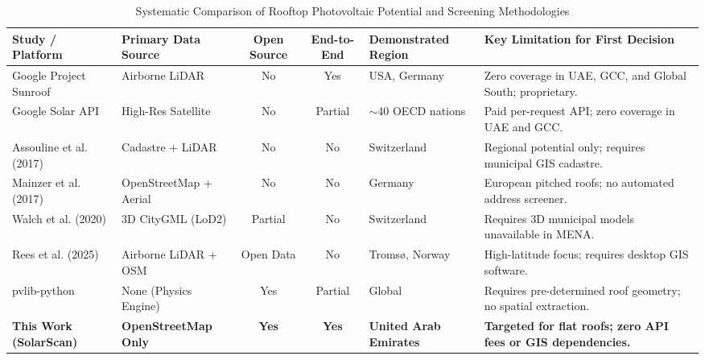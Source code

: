 \begin{table}[t]
\centering
\caption{Systematic Comparison of Rooftop Photovoltaic Potential and Screening Methodologies}
\label{tab:prior_art}
\footnotesize
\setlength{\tabcolsep}{3.5pt}
\begin{tabular}{p{2.9cm}p{2.6cm}ccp{2.5cm}p{5.6cm}}
\toprule
\textbf{Study / Platform} & \textbf{Primary Data Source} & \textbf{Open Source} & \textbf{End-to-End} & \textbf{Demonstrated Region} & \textbf{Key Limitation for First Decision} \\
\midrule
Google Project Sunroof & Airborne LiDAR & No & Yes & USA, Germany & Zero coverage in UAE, GCC, and Global South; proprietary. \\
Google Solar API & High-Res Satellite & No & Partial & $\sim$40 OECD nations & Paid per-request API; zero coverage in UAE and GCC. \\
Assouline et al. (2017) \cite{assouline2017} & Cadastre + LiDAR & No & No & Switzerland & Regional potential only; requires municipal GIS cadastre. \\
Mainzer et al. (2017) \cite{mainzer2017} & OpenStreetMap + Aerial & No & No & Germany & European pitched roofs; no automated address screener. \\
Walch et al. (2020) \cite{walch2020} & 3D CityGML (LoD2) & Partial & No & Switzerland & Requires 3D municipal models unavailable in MENA. \\
Rees et al. (2025) \cite{rees2025} & Airborne LiDAR + OSM & Open Data & No & Troms\o, Norway & High-latitude focus; requires desktop GIS software. \\
pvlib-python \cite{holmgren2018} & None (Physics Engine) & Yes & Partial & Global & Requires pre-determined roof geometry; no spatial extraction. \\
\textbf{This Work (SolarScan)} & \textbf{OpenStreetMap Only} & \textbf{Yes} & \textbf{Yes} & \textbf{United Arab Emirates} & \textbf{Targeted for flat roofs; zero API fees or GIS dependencies.} \\
\bottomrule
\end{tabular}
\end{table}
